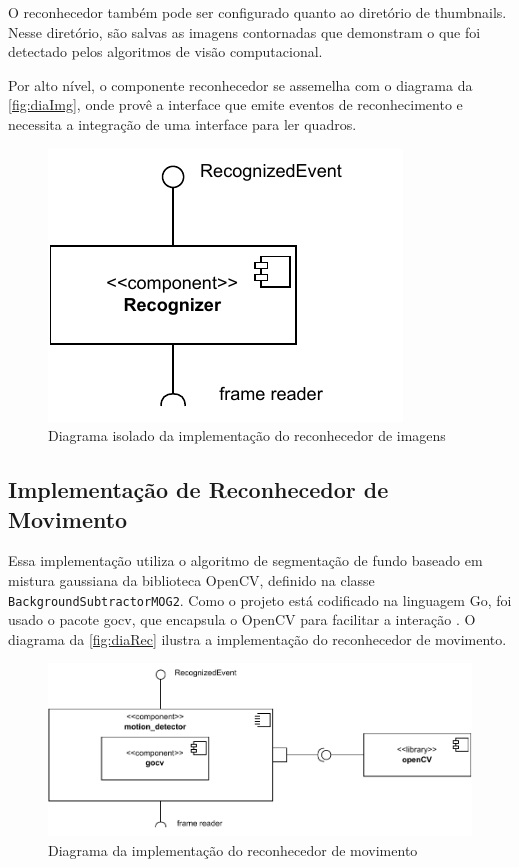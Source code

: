 \documentclass[12pt, %
openright, 
oneside, %
a4paper,    %
brazil]{facom-ufu-abntex2}
\begin{document}
O reconhecedor também pode ser configurado quanto ao diretório de thumbnails.
Nesse diretório, são salvas as imagens contornadas que demonstram o que foi
detectado pelos algoritmos de visão computacional.

Por alto nível, o componente reconhecedor se assemelha com o diagrama da
\autoref{fig:diaImg}, onde provê a interface que emite eventos de
reconhecimento e necessita a integração de uma interface para ler quadros.

\begin{figure}[!ht]
	\centering
	\includegraphics[width=0.4\linewidth]{recognizer.pdf}
	\caption[Diagrama isolado da implementação do reconhecedor de
		imagens]{Diagrama isolado da implementação do reconhecedor de imagens}
	\label{fig:diaImg}
\end{figure}

\subsection{Implementação de Reconhecedor de Movimento}

Essa implementação utiliza o algoritmo de segmentação de fundo baseado em
mistura gaussiana da biblioteca OpenCV, definido na classe
\texttt{BackgroundSubtractorMOG2}. Como o projeto está codificado na linguagem
Go, foi usado o pacote gocv, que encapsula o OpenCV para facilitar a interação
\cite{gocv_package}. O diagrama da \autoref{fig:diaRec} ilustra a implementação
do reconhecedor de movimento.

\begin{figure}[!ht]
	\centering
	\includegraphics[width=1.0\linewidth]{motion_detector.pdf}
	\caption[Diagrama da implementação do reconhecedor de
		movimento]{Diagrama da implementação do reconhecedor de movimento}
	\label{fig:diaRec}
\end{figure}
\end{document}
